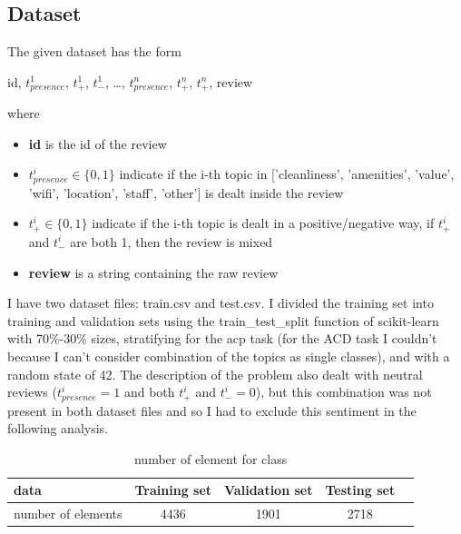 \documentclass{article}
\begin{document}
        \subsection{Dataset}\label{subsec:datset}
        The given dataset has the form
        \\\centerline{id, $t^{1}_{presence}$, $t^{1}_{+}$, $t^{1}_{-}$, \ldots , $t^{n}_{presence}$, $t^{n}_{+}$, $t^{n}_{+}$, review}
        where
        \begin{itemize}
            \item \textbf{id} is the id of the review
            \item \textbf{$t^{i}_{presence} \in \{0, 1\}$} indicate if the i-th topic in ['cleanliness', 'amenities', 'value', 'wifi', 'location', 'staff', 'other'] is dealt inside the review
            \item \textbf{$t^{i}_{+} \in \{0, 1\}$} indicate if the i-th topic is dealt in a positive/negative way, if $t^{i}_{+}$ and $t^{i}_{-}$ are both 1, then the review is mixed
            \item \textbf{review} is a string containing the raw review
        \end{itemize}
        I have two dataset files: train.csv and test.csv.
        I divided the training set into training and validation sets using the train\_test\_split function of scikit-learn with 70\%-30\% sizes, stratifying for the acp task (for the ACD task I couldn't because I can't consider combination of the topics as single classes), and with a random state of 42.
        The description of the problem also dealt with neutral reviews ($t^{i}_{presence} = 1$ and both $t^{i}_{+}$ and $t^{i}_{-} = 0$), but this combination was not present in both dataset files and so I had to exclude this sentiment in the following analysis.
        \begin{table}[h!]
            \begin{center}
                \caption{number of element for class}
                \label{tab:table1}
                \begin{tabular}{l|c|c|c|r}
                    \textbf{data} & \textbf{Training set} & \textbf{Validation set} & \textbf{Testing set}\\
                    \hline
                        number of elements & 4436 & 1901 & 2718\\
                \end{tabular}
            \end{center}
        \end{table}
\end{document}
